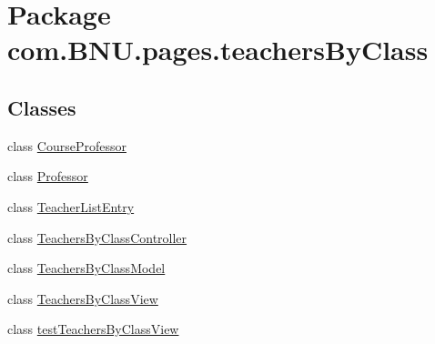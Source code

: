 \hypertarget{namespacecom_1_1_b_n_u_1_1pages_1_1teachers_by_class}{}\section{Package com.\+B\+N\+U.\+pages.\+teachers\+By\+Class}
\label{namespacecom_1_1_b_n_u_1_1pages_1_1teachers_by_class}
\subsection*{Classes}
\begin{DoxyCompactItemize}
\item 
class \mbox{\hyperlink{classcom_1_1_b_n_u_1_1pages_1_1teachers_by_class_1_1_course_professor}{Course\+Professor}}
\item 
class \mbox{\hyperlink{classcom_1_1_b_n_u_1_1pages_1_1teachers_by_class_1_1_professor}{Professor}}
\item 
class \mbox{\hyperlink{classcom_1_1_b_n_u_1_1pages_1_1teachers_by_class_1_1_teacher_list_entry}{Teacher\+List\+Entry}}
\item 
class \mbox{\hyperlink{classcom_1_1_b_n_u_1_1pages_1_1teachers_by_class_1_1_teachers_by_class_controller}{Teachers\+By\+Class\+Controller}}
\item 
class \mbox{\hyperlink{classcom_1_1_b_n_u_1_1pages_1_1teachers_by_class_1_1_teachers_by_class_model}{Teachers\+By\+Class\+Model}}
\item 
class \mbox{\hyperlink{classcom_1_1_b_n_u_1_1pages_1_1teachers_by_class_1_1_teachers_by_class_view}{Teachers\+By\+Class\+View}}
\item 
class \mbox{\hyperlink{classcom_1_1_b_n_u_1_1pages_1_1teachers_by_class_1_1test_teachers_by_class_view}{test\+Teachers\+By\+Class\+View}}
\end{DoxyCompactItemize}
